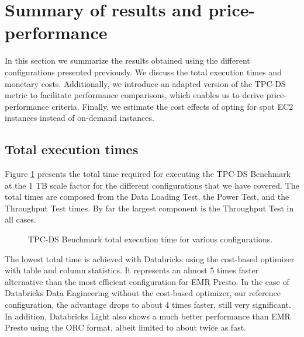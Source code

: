 \section{Summary of results and price-performance}\label{resultsSummary}

In this section we summarize the results obtained using the different configurations presented previously. We discuss the total execution times and monetary costs. Additionally, we introduce an adapted version of the TPC-DS metric to facilitate performance comparisons, which enables us to derive price-performance criteria. Finally, we estimate the cost effects of opting for spot EC2 instances instead of on-demand instances.

\subsection{Total execution times}\label{resultsSummaryTotalExecutionTimes}

Figure \ref{fig:resultsSummaryTotalTimes} presents the total time required for executing the TPC-DS Benchmark at the 1 TB scale factor for the different configurations that we have covered. The total times are composed from the Data Loading Test, the Power Test, and the Throughput Test times. By far the largest component is the Throughput Test in all cases.

\begin{figure}
   \begin{center}
   \end{center}
   \caption{TPC-DS Benchmark total execution time for various configurations.}
   \label{fig:resultsSummaryTotalTimes}
\end{figure}

The lowest total time is achieved with Databricks using the cost-based optimizer with table and column statistics. It represents an almost 5 times faster alternative than the most efficient configuration for EMR Presto. In the case of Databricks Data Engineering without the cost-based optimizer, our reference configuration, the advantage drops to about 4 times faster, still very significant. In addition, Databricks Light also shows a much better performance than EMR Presto using the ORC format, albeit limited to about twice as fast.

